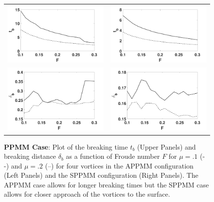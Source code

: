 \documentclass[a4paper,11pt]{article}
\begin{document}
\begin{figure}[!h]
\centering
\begin{tabular}{cc}
\includegraphics[width=.5\textwidth]{froude_comp_ppmm} & \includegraphics[width=.5\textwidth]{froude_comp_ppmm_sym}\\
\includegraphics[width=.5\textwidth]{zmb_ppmm} & \includegraphics[width=.5\textwidth]{zmb_ppmm_sym}
\end{tabular}
\caption{\small {\bf PPMM Case}: Plot of the breaking time $t_{b}$ (Upper Panels) and breaking distance $\delta_{b}$ as a function of Froude number $F$ for $\mu=.1$ (- -) and $\mu=.2$ (--) for four vortices in the APPMM configuration (Left Panels) and the SPPMM configuration (Right Panels). The APPMM case allows for longer breaking times but the SPPMM case allows for closer approach of the vortices to the surface.}
\label{fig:froudecomp_ppmm}
\end{figure}
\end{document}
